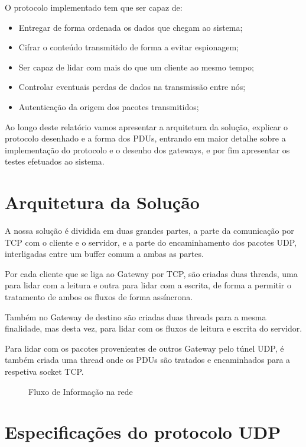 \documentclass[a4paper]{report}
\begin{document}
O protocolo implementado tem que ser capaz de: 

\begin{itemize}
        \item Entregar de forma ordenada os dados que chegam ao sistema;
        \item Cifrar o conteúdo transmitido de forma a evitar espionagem;
        \item Ser capaz de lidar com mais do que um cliente ao mesmo tempo;
        \item Controlar eventuais perdas de dados na transmissão entre nós;
        \item Autenticação da origem dos pacotes transmitidos;
\end{itemize}

Ao longo deste relatório vamos apresentar a arquitetura da solução, explicar
o protocolo desenhado e a forma dos PDUs, entrando em maior detalhe sobre a
implementação do protocolo e o desenho dos gateways, e por fim apresentar os
testes efetuados ao sistema.

\chapter{Arquitetura da Solução}

A nossa solução é dividida em duas grandes partes, a parte da comunicação
por TCP com o cliente e o servidor, e a parte do encaminhamento dos pacotes
UDP, interligadas entre um buffer comum a ambas as partes.

Por cada cliente que se liga ao Gateway por TCP, são criadas duas threads, 
uma para lidar com a leitura e outra para lidar com a escrita, de forma
a permitir o tratamento de ambos os fluxos de forma assíncrona.

Também no Gateway de destino são criadas duas threads para a mesma finalidade,
mas desta vez, para lidar com os fluxos de leitura e escrita do servidor.

Para lidar com os pacotes provenientes de outros Gateway pelo túnel UDP,
é também criada uma thread onde os PDUs são tratados e encaminhados para a
respetiva socket TCP.

\begin{figure}[H]
    \hspace*{-2cm}
    
    \caption{Fluxo de Informação na rede}\label{fig:structure}
\end{figure}

\chapter{Especificações do protocolo UDP}
\end{document}
